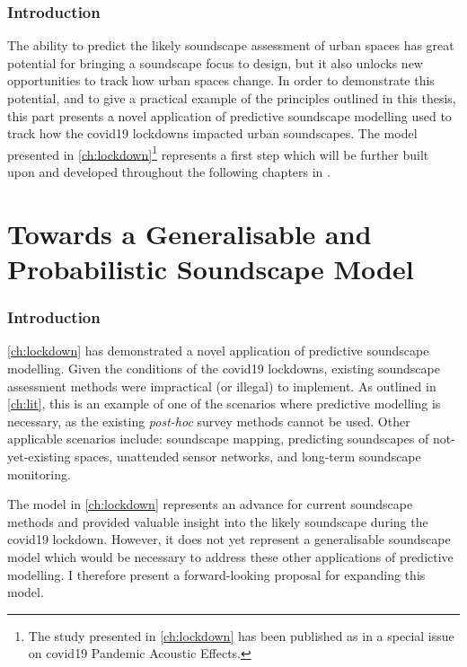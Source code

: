 \documentclass[twoside,fontsize=11pt,titlepage,chapterprefix=true
]{scrbook}
\begin{document}
\section*{Introduction}

The ability to predict the likely soundscape assessment of urban spaces has great potential for bringing a soundscape focus to design, but it also unlocks new opportunities to track how urban spaces change. In order to demonstrate this potential, and to give a practical example of the principles outlined in this thesis, this part presents a novel application of predictive soundscape modelling used to track how the \gls{covid19} lockdowns impacted urban soundscapes. The model presented in \cref{ch:lockdown}\footnote{The study presented in \cref{ch:lockdown} has been published as \citep{Mitchell2021Investigating} in a special issue on \gls{covid19} Pandemic Acoustic Effects. } represents a first step which will be further built upon and developed throughout the following chapters in \cref{part:generalModel}.




\part{Towards a Generalisable and Probabilistic Soundscape Model}
\label{part:generalModel}
\section*{Introduction}
\cref{ch:lockdown} has demonstrated a novel application of predictive soundscape modelling. Given the conditions of the \gls{covid19} lockdowns, existing soundscape assessment methods were impractical (or illegal) to implement. As outlined in \cref{ch:lit}, this is an example of one of the scenarios where predictive modelling is necessary, as the existing \emph{post-hoc} survey methods cannot be used. Other applicable scenarios include: soundscape mapping, predicting soundscapes of not-yet-existing spaces, unattended sensor networks, and long-term soundscape monitoring.

The model in \cref{ch:lockdown} represents an advance for current soundscape methods and provided valuable insight into the likely soundscape during the \gls{covid19} lockdown. However, it does not yet represent a generalisable soundscape model which would be necessary to address these other applications of predictive modelling. I therefore present a forward-looking proposal for expanding this model.
\end{document}
